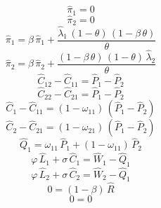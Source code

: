 \begin{dmath}
{{\hat{\pi}_{1}}}=0
\end{dmath}
\begin{dmath}
{{\hat{\pi}_{2}}}=0
\end{dmath}
\begin{dmath}
{{\hat{\pi}_{1}}}={{\beta}}\, {{\hat{\pi}_{1}}}+\frac{{{\hat{\lambda}_{1}}}\, \left(1-{{\theta}}\right)\, \left(1-{{\beta}}\, {{\theta}}\right)}{{{\theta}}}
\end{dmath}
\begin{dmath}
{{\hat{\pi}_{2}}}={{\beta}}\, {{\hat{\pi}_{2}}}+\frac{\left(1-{{\beta}}\, {{\theta}}\right)\, \left(1-{{\theta}}\right)\, {{\hat{\lambda}_{2}}}}{{{\theta}}}
\end{dmath}
\begin{dmath}
{{\hat{C}_{1 2}}}-{{\hat{C}_{1 1}}}={{\hat{P}_{1}}}-{{\hat{P}_{2}}}
\end{dmath}
\begin{dmath}
{{\hat{C}_{2 2}}}-{{\hat{C}_{2 1}}}={{\hat{P}_{1}}}-{{\hat{P}_{2}}}
\end{dmath}
\begin{dmath}
{{\hat{C}_{1}}}-{{\hat{C}_{1 1}}}=\left(1-{{\omega_{11}}}\right)\, \left({{\hat{P}_{1}}}-{{\hat{P}_{2}}}\right)
\end{dmath}
\begin{dmath}
{{\hat{C}_{2}}}-{{\hat{C}_{2 1}}}=\left(1-{{\omega_{21}}}\right)\, \left({{\hat{P}_{1}}}-{{\hat{P}_{2}}}\right)
\end{dmath}
\begin{dmath}
{{\hat{Q}_{1}}}={{\omega_{11}}}\, {{\hat{P}_{1}}}+\left(1-{{\omega_{11}}}\right)\, {{\hat{P}_{2}}}
\end{dmath}
\begin{dmath}
{{\varphi}}\, {{\hat{L}_{1}}}+{{\sigma}}\, {{\hat{C}_{1}}}={{\hat{W}_{1}}}-{{\hat{Q}_{1}}}
\end{dmath}
\begin{dmath}
{{\varphi}}\, {{\hat{L}_{2}}}+{{\sigma}}\, {{\hat{C}_{2}}}={{\hat{W}_{2}}}-{{\hat{Q}_{1}}}
\end{dmath}
\begin{dmath}
0=\left(1-{{\beta}}\right)\, {{\hat{R}}}
\end{dmath}
\begin{dmath}
0=0
\end{dmath}
